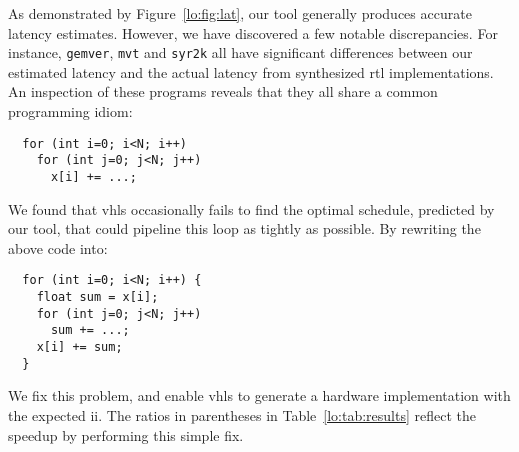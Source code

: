 As demonstrated by Figure~\ref{lo:fig:lat}, our tool generally produces
accurate latency estimates. However, we have discovered a few notable
discrepancies. For instance, \verb|gemver|, \verb|mvt| and \verb|syr2k| all
have significant differences between our estimated latency and the actual
latency from synthesized \gls{rtl} implementations.  An inspection of these
programs reveals that they all share a common programming idiom:
%
\begin{lstlisting}
  for (int i=0; i<N; i++)
    for (int j=0; j<N; j++)
      x[i] += ...;
\end{lstlisting}
%
We found that \gls{vhls} occasionally fails to find the optimal schedule,
predicted by our tool, that could pipeline this loop as tightly as possible.
By rewriting the above code into:
%
\begin{lstlisting}
  for (int i=0; i<N; i++) {
    float sum = x[i];
    for (int j=0; j<N; j++)
      sum += ...;
    x[i] += sum;
  }
\end{lstlisting}
%
We fix this problem, and enable \gls{vhls} to generate a hardware
implementation with the expected \gls{ii}. The ratios in parentheses in
Table~\ref{lo:tab:results} reflect the speedup by performing this simple fix.

